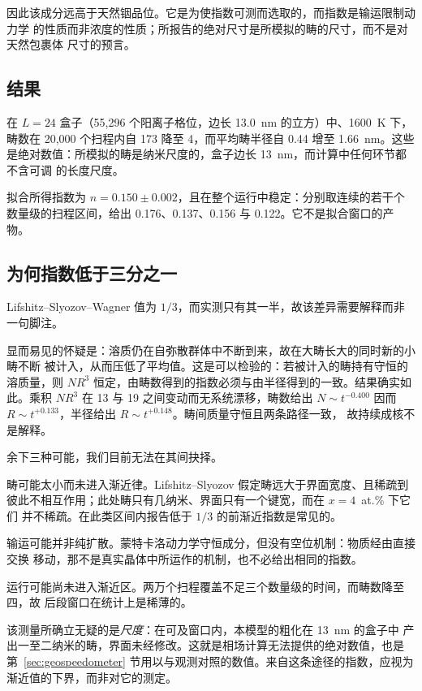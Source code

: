 \documentclass[11pt,a4paper]{ctexart}
\begin{document}
因此该成分远高于天然铟品位。它是为使指数可测而选取的，而指数是输运限制动力学
的性质而非浓度的性质；所报告的绝对尺寸是所模拟的畴的尺寸，而不是对天然包裹体
尺寸的预言。

\subsection{结果}

在 $L = 24$ 盒子（55{,}296 个阳离子格位，边长 13.0~nm 的立方）中、1600~K 下，
畴数在 20{,}000 个扫程内自 173 降至 4，而平均畴半径自 0.44 增至 1.66~nm。这些
是绝对数值：所模拟的畴是纳米尺度的，盒子边长 13~nm，而计算中任何环节都不含可调
的长度尺度。

拟合所得指数为 $n = 0.150 \pm 0.002$，且在整个运行中稳定：分别取连续的若干个
数量级的扫程区间，给出 0.176、0.137、0.156 与 0.122。它不是拟合窗口的产物。

\subsection{为何指数低于三分之一}

Lifshitz--Slyozov--Wagner 值为 $1/3$，而实测只有其一半，故该差异需要解释而非
一句脚注。

显而易见的怀疑是：溶质仍在自弥散群体中不断到来，故在大畴长大的同时新的小畴不断
被计入，从而压低了平均值。这是可以检验的：若被计入的畴持有守恒的溶质量，则
$NR^3$ 恒定，由畴数得到的指数必须与由半径得到的一致。结果确实如此。乘积
$NR^3$ 在 13 与 19 之间变动而无系统漂移，畴数给出 $N \sim t^{-0.400}$ 因而
$R \sim t^{+0.133}$，半径给出 $R \sim t^{+0.148}$。畴间质量守恒且两条路径一致，
故持续成核不是解释。

余下三种可能，我们目前无法在其间抉择。

畴可能太小而未进入渐近律。Lifshitz--Slyozov 假定畴远大于界面宽度、且稀疏到
彼此不相互作用；此处畴只有几纳米、界面只有一个键宽，而在 $x = 4$~at.\% 下它们
并不稀疏。在此类区间内报告低于 $1/3$ 的前渐近指数是常见的。

输运可能并非纯扩散。蒙特卡洛动力学守恒成分，但没有空位机制：物质经由直接交换
移动，那不是真实晶体中所运作的机制，也不必给出相同的指数。

运行可能尚未进入渐近区。两万个扫程覆盖不足三个数量级的时间，而畴数降至四，故
后段窗口在统计上是稀薄的。

该测量所确立无疑的是\emph{尺度}：在可及窗口内，本模型的粗化在 13~nm 的盒子中
产出一至二纳米的畴，界面未经修改。这就是相场计算无法提供的绝对数值，也是
第~\ref{sec:geospeedometer} 节用以与观测对照的数值。来自这条途径的指数，应视为
渐近值的下界，而非对它的测定。
\end{document}
